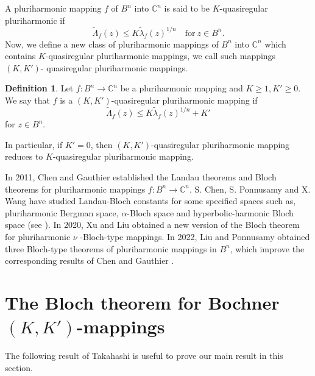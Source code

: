 \documentclass[a4paper,12pt,reqno]{amsart}
\theoremstyle{plain}
\theoremstyle{definition}
\newtheorem{defn}{Definition}[section]
\newcommand{\IC}{{\mathbb C}}
\numberwithin{equation}{section}
\begin{document}
A pluriharmonic mapping $f$ of $B^n$ into $\IC^n$ is said to be $K$-quasiregular pluriharmonic if
 $$
       \widetilde{\Lambda}_f(z)\leq K\widetilde{\lambda}_f(z)^{1/n}\quad \text{for} \ z\in B^n. 
 $$
Now, we define a new class of pluriharmonic mappings of $B^n$ into $\mathbb{C}^n$ which contains $K$-quasiregular pluriharmonic mappings, we call such mappings $\left(K, K'\right)$- quasiregular pluriharmonic mappings.
\begin{defn}\label{Rohi-Vasu-P2-Definition-003}
Let $f: B^n \to \IC^n$ be a pluriharmonic mapping and $K\geq 1, K'\geq 0$. We say that $f$ is a $(K,K')$-quasiregular pluriharmonic mapping if $$\widetilde{\Lambda}_f(z)\leq K\widetilde{\lambda}_f(z)^{1/n}+K'$$ for $z\in B^n$.

In particular, if $K'=0$, then $(K,K')$-quasiregular pluriharmonic mapping reduces to $K$-quasiregular pluriharmonic mapping. 
\end{defn}
\vspace{2mm}
In 2011, Chen and Gauthier \cite{Chen-Gauthier-2011} established the Landau theorems and Bloch theorems for pluriharmonic mappings $f: B^n \to \IC^n.$ S. Chen, S. Ponnusamy and X. Wang  have studied Landau-Bloch constants for some specified spaces such as, pluriharmonic Bergman space, $\alpha$-Bloch space and hyperbolic-harmonic Bloch space (see \cite{Chen-Ponnusamy-Wang-2012-a,Chen-Ponnusamy-Wang-2012-b,Chen-Ponnusamy-Wang-2012-c,Chen-Ponnusamy-Wang-2015}). In 2020, Xu and Liu  \cite{Xu-Liu-2020} obtained a new version of the Bloch theorem for pluriharmonic $\nu$ -Bloch-type mappings. In 2022, Liu and Ponnusamy \cite{Liu-Ponnusamy-2022} obtained three Bloch-type theorems of pluriharmonic mappings in $B^n$, which improve the corresponding results of Chen and Gauthier \cite{Chen-Gauthier-2011}.

 
\section{ The Bloch theorem for Bochner $(K,K')$-mappings}
The following result of Takahashi \cite{Takahashi-1951} is useful to prove our main result in this section.
\end{document}
